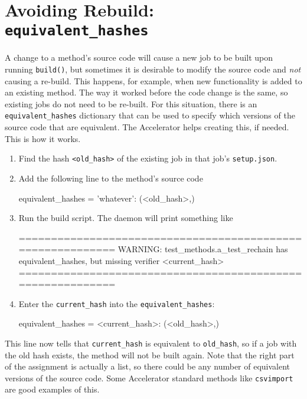 \section{Avoiding Rebuild: \texttt{equivalent\_hashes}}
\label{sec:equivalent_hashes}

A change to a method's source code will cause a new job to be built
upon running \texttt{build()}, but sometimes it is
desirable to modify the source code and \textsl{not} causing a
re-build.  This happens, for example, when new functionality is added
to an existing method.  The way it worked before the code change is
the same, so existing jobs do not need to be re-built.  For this
situation, there is an \texttt{equivalent\_hashes} dictionary that can
be used to specify which versions of the source code that are
equivalent.  The Accelerator helps creating this, if needed.  This is
how it works.
\begin{enumerate}
\item Find the hash \texttt{<old\_hash>} of the existing job in that job's \texttt{setup.json}.
\item Add the following line to the method's source code
\begin{python}
equivalent_hashes = {'whatever': (<old_hash>,)}
\end{python}
\item Run the build script.  The daemon will print something like
\begin{shell}
===========================================================
WARNING: test_methods.a_test_rechain has equivalent_hashes,
but missing verifier <current_hash>
===========================================================
\end{shell}
\item Enter the \texttt{current\_hash} into the \texttt{equivalent\_hashes}:
\begin{python}
equivalent_hashes = {<current_hash>: (<old_hash>,)}
\end{python}
\end{enumerate}
This line now tells that \texttt{current\_hash} is equivalent
to \texttt{old\_hash}, so if a job with the old hash exists, the
method will not be built again.  Note that the right part of the
assignment is actually a list, so there could be any number of
equivalent versions of the source code.  Some Accelerator standard
methods like \texttt{csvimport} are good examples of this.





